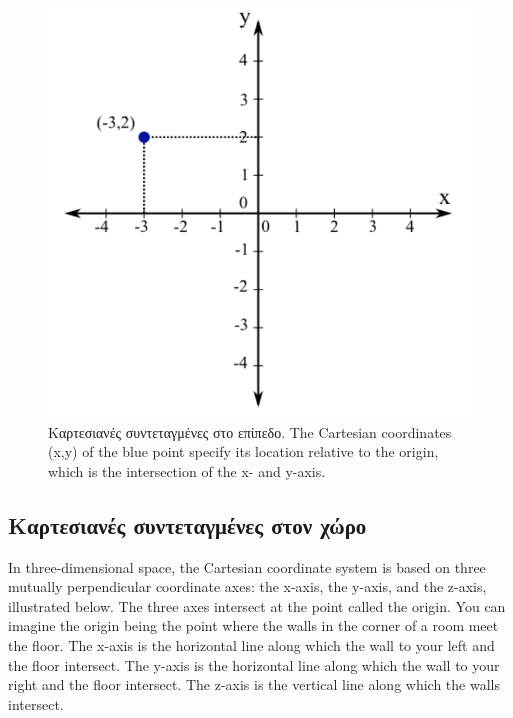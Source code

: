 \begin{figure}[h]
    \centering
    \includegraphics[scale=0.5]{Figures/appendixA_cartesian2D.png}
    \caption{Καρτεσιανές συντεταγμένες στο επίπεδο. The Cartesian coordinates (x,y) of the blue point specify its location relative to the origin, which is the intersection of the x- and y-axis.}
    \label{fig:apxA_cartesian2D}
\end{figure}


\subsection{Καρτεσιανές συντεταγμένες στον χώρο}
In three-dimensional space, the Cartesian coordinate system is based on three mutually perpendicular coordinate axes: the x-axis, the y-axis, and the z-axis, illustrated below. The three axes intersect at the point called the origin. You can imagine the origin being the point where the walls in the corner of a room meet the floor. The x-axis is the horizontal line along which the wall to your left and the floor intersect. The y-axis is the horizontal line along which the wall to your right and the floor intersect. The z-axis is the vertical line along which the walls intersect.

